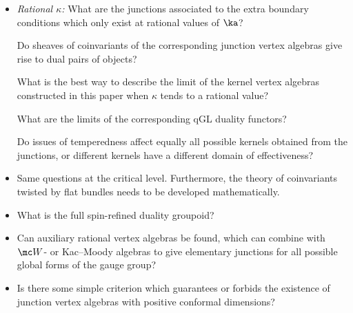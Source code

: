 \documentclass[11pt,reqno]{amsart}
\theoremstyle{plain}
\numberwithin{equation}{section}
\theoremstyle{definition}
\begin{document}
\begin{itemize}
\item {\em Rational $\kappa$:} What are the junctions associated to
  the extra boundary conditions which only exist at rational values of
  $\ka$?

Do sheaves of coinvariants of the corresponding junction
  vertex algebras give rise to dual pairs of objects?

What is the best
  way to describe the limit of the kernel vertex algebras constructed
  in this paper when $\kappa$ tends to a rational value?

What are the limits of the corresponding qGL
  duality functors?

Do issues of temperedness affect equally all
  possible kernels obtained from the junctions, or different kernels
  have a different domain of effectiveness?

\medskip

\item Same questions at the critical level. Furthermore, the theory of
  coinvariants twisted by flat bundles needs to be developed
  mathematically.

\medskip

\item What is the full spin-refined duality groupoid? 

\medskip

\item Can auxiliary rational vertex algebras be found, which can
  combine with ${\mc W}$- or Kac--Moody algebras to give elementary
  junctions for all possible global forms of the gauge group?

\medskip

\item Is there some simple criterion which guarantees or forbids the
  existence of junction vertex algebras with positive conformal
  dimensions?
\end{itemize}
\end{document}

